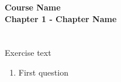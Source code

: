 \documentclass[a4paper,11pt]{article}
\begin{document}
\pagestyle{fancy}
\lhead{\small }
\chead{\small \the\year}
\rhead{\small }



\thispagestyle{plain}
\begin{center}
    \textbf{\large
        Course Name \\
        Chapter 1 - Chapter Name
    }
\end{center}
\vspace{-1.5em}



\section{}

Exercise text

\begin{enumerate}[label=(\alph*),
                  leftmargin=2\parindent,
                  rightmargin=2\parindent]

    \item{\label{item:item1}
          First question}

\end{enumerate}
\end{document}
